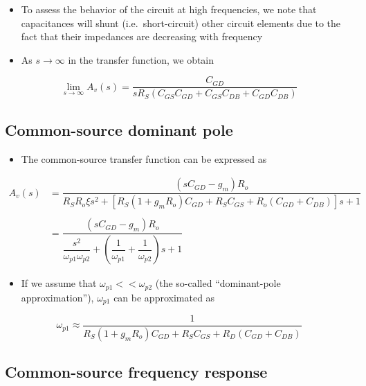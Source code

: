 \documentclass[11pt]{article}
\providecommand{\tightlist}{%
      \setlength{\itemsep}{0pt}\setlength{\parskip}{0pt}}
\begin{document}
    \begin{itemize}
\tightlist
\item
  To assess the behavior of the circuit at high frequencies, we note
  that capacitances will shunt (i.e.~short-circuit) other circuit
  elements due to the fact that their impedances are decreasing with
  frequency
\item
  As \(s \rightarrow \infty\) in the transfer function, we obtain
\end{itemize}

\begin{equation}
\lim_{s\rightarrow \infty}{A_v(s)} = \dfrac{C_{GD}}{sR_S(C_{GS}C_{GD} + C_{GS}C_{DB} + C_{GD}C_{DB})}
\end{equation}

    \hypertarget{common-source-dominant-pole}{%
\subsection{Common-source dominant
pole}\label{common-source-dominant-pole}}

    \begin{itemize}
\tightlist
\item
  The common-source transfer function can be expressed as
\end{itemize}

\begin{align}
A_v(s) &= \dfrac{(sC_{GD} - g_m)R_o}{R_S R_o\xi s^2 + [R_S(1+g_mR_o)C_{GD} + R_SC_{GS}+R_o(C_{GD} + C_{DB})]s+1} \\
\\
&=\dfrac{(sC_{GD} - g_m)R_o}{\dfrac{s^2}{\omega_{p1}\omega_{p2}} + \left(\dfrac{1}{\omega_{p1}}+\dfrac{1}{\omega_{p2}} \right)s + 1
}\end{align}

\begin{itemize}
\tightlist
\item
  If we assume that \(\omega_{p1} << \omega_{p2}\) (the so-called
  ``dominant-pole approximation''), \(\omega_{p1}\) can be approximated
  as
\end{itemize}

\begin{equation}
\omega_{p1} \approx \dfrac{1}{R_S(1+g_mR_o)C_{GD} + R_SC_{GS}+R_D(C_{GD} + C_{DB})}
\end{equation}

    \hypertarget{common-source-frequency-response}{%
\subsection{Common-source frequency
response}\label{common-source-frequency-response}}
\end{document}
